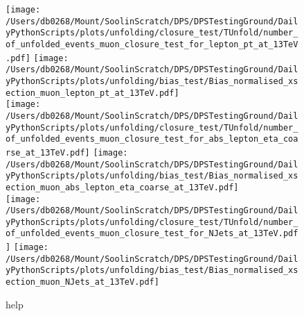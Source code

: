 \begin{figure*}[htpb]
	\centering
	\texttt{[image: /Users/db0268/Mount/SoolinScratch/DPS/DPSTestingGround/DailyPythonScripts/plots/unfolding/closure\_test/TUnfold/number\_of\_unfolded\_events\_muon\_closure\_test\_for\_lepton\_pt\_at\_13TeV.pdf]}
	\texttt{[image: /Users/db0268/Mount/SoolinScratch/DPS/DPSTestingGround/DailyPythonScripts/plots/unfolding/bias\_test/Bias\_normalised\_xsection\_muon\_lepton\_pt\_at\_13TeV.pdf]} \\
	\texttt{[image: /Users/db0268/Mount/SoolinScratch/DPS/DPSTestingGround/DailyPythonScripts/plots/unfolding/closure\_test/TUnfold/number\_of\_unfolded\_events\_muon\_closure\_test\_for\_abs\_lepton\_eta\_coarse\_at\_13TeV.pdf]}
	\texttt{[image: /Users/db0268/Mount/SoolinScratch/DPS/DPSTestingGround/DailyPythonScripts/plots/unfolding/bias\_test/Bias\_normalised\_xsection\_muon\_abs\_lepton\_eta\_coarse\_at\_13TeV.pdf]} \\
	\texttt{[image: /Users/db0268/Mount/SoolinScratch/DPS/DPSTestingGround/DailyPythonScripts/plots/unfolding/closure\_test/TUnfold/number\_of\_unfolded\_events\_muon\_closure\_test\_for\_NJets\_at\_13TeV.pdf]}
	\texttt{[image: /Users/db0268/Mount/SoolinScratch/DPS/DPSTestingGround/DailyPythonScripts/plots/unfolding/bias\_test/Bias\_normalised\_xsection\_muon\_NJets\_at\_13TeV.pdf]} \\
	\caption[help]{help}
	\label{fig:ClosureBiasmu2}
\end{figure*}